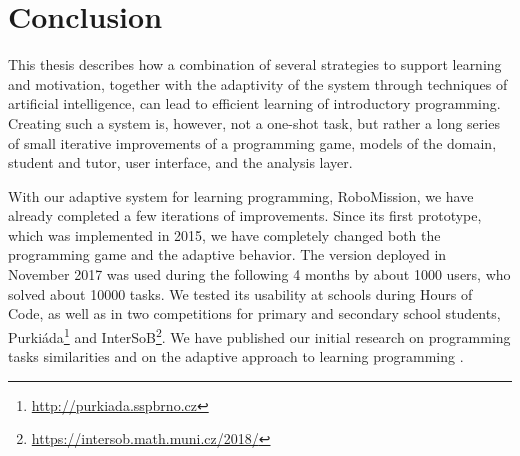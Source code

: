 \chapter{Conclusion}
\label{chap:conclusion}



This thesis describes how a combination of several strategies to support
learning and motivation, together with the adaptivity of the system
through techniques of artificial intelligence,
can lead to efficient learning of introductory programming. %
Creating such a system is, however, not a one-shot task, but rather a long series
of small iterative improvements of a programming game,
models of the domain, student and tutor, user interface, and the analysis layer.

With our adaptive system for learning programming, RoboMission,
we have already completed a few iterations of improvements.
Since its first prototype, which was implemented in 2015,
we have completely changed both the programming game and the adaptive behavior.
The version deployed in November 2017 was used during the following 4 months
by about 1000 users, who solved about 10000 tasks.
We tested its usability at schools during Hours of Code,
as well as in two competitions for primary and secondary school students,
Purkiáda\footnote{\url{http://purkiada.sspbrno.cz}} and
InterSoB\footnote{\url{https://intersob.math.muni.cz/2018/}}.
We have published  our initial research on programming tasks similarities \cite{alg.similarity}
and on the adaptive approach to learning programming \cite{robomission}.




